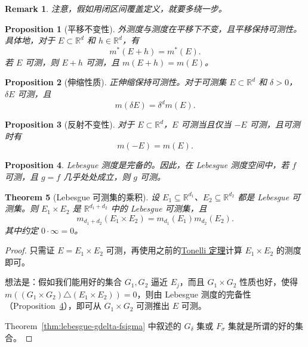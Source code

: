 \documentclass[12pt,letterpaper,twoside,openright]{ctexbook}
\theoremstyle{bluehead}
\newtheorem{theorem}{Theorem}
\newtheorem{proposition}[theorem]{Proposition}
\theoremstyle{olivehead}
\theoremstyle{orangehead}
\theoremstyle{redremark}
\newtheorem*{remark}{Remark}
\begin{document}
\begin{remark}
注意，假如用闭区间覆盖定义，就要多绕一步。
\end{remark}

\begin{proposition}[平移不变性]
外测度与测度在平移下不变，且平移保持可测性。具体地，对于 $E\subset\mathbb{R}^d$ 和 $h\in\mathbb{R}^d$，有
\[
m^*(E+h)=m^*(E).
\]
若 $E$ 可测，则 $E+h$ 可测，且 $m(E+h)=m(E)$。
\end{proposition}

\begin{proposition}[伸缩性质]
正伸缩保持可测性。对于可测集 $E\subset\mathbb{R}^d$ 和 $\delta>0$，$\delta E$ 可测，且
\[
m(\delta E)=\delta^d m(E).
\]
\end{proposition}

\begin{proposition}[反射不变性]
对于 $E\subset\mathbb{R}^d$，$E$ 可测当且仅当 $-E$ 可测，且可测时有
\[
m(-E)=m(E).
\]
\end{proposition}
\begin{proposition}\label{prop:lebesgue-complete}
Lebesgue 测度是完备的。因此，在 Lebesgue 测度空间中，若 $f$ 可测，且 $g=f$ 几乎处处成立，则 $g$ 可测。
\end{proposition}
\begin{theorem}[Lebesgue 可测集的乘积]
设 $E_1\subseteq\mathbb R^{d_1}$、$E_2\subseteq\mathbb R^{d_2}$ 都是 Lebesgue 可测集。则 $E_1\times E_2$ 是 $\mathbb R^{d_1+d_2}$ 中的 Lebesgue 可测集，且
\[
m_{d_1+d_2}(E_1\times E_2)=m_{d_1}(E_1)m_{d_2}(E_2).
\]
其中约定 $0\cdot\infty=0$。
\end{theorem}
\begin{proof}
只需证 $E=E_1\times E_2$ 可测，再使用之前的\hyperref[thm:tonelli-general]{Tonelli 定理}计算 $E_1\times E_2$ 的测度即可。

想法是：假如我们能用好的集合 $G_1,G_2$ 逼近 $E_j$，而且 $G_1\times G_2$ 性质也好，使得 $m((G_1\times G_2)\triangle(E_1\times E_2))=0$，则由 Lebesgue 测度的完备性（Proposition~\ref{prop:lebesgue-complete}），即可从 $G_1\times G_2$ 可测推出 $E$ 可测。

Theorem~\ref{thm:lebesgue-gdelta-fsigma} 中叙述的 $G_\delta$ 集或 $F_\sigma$ 集就是所谓的好的集合。
\end{proof}
\end{document}
